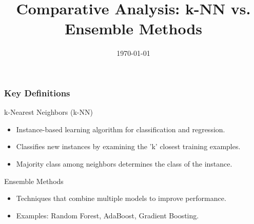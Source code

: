 \documentclass[aspectratio=169]{beamer}
\begin{document}
\begin{frame}
    \title{Comparative Analysis: k-NN vs. Ensemble Methods}
    \date{\today}
    \maketitle
\end{frame}

\begin{frame}[fragile]
    \frametitle{Key Definitions}

    \begin{block}{k-Nearest Neighbors (k-NN)}
        \begin{itemize}
            \item Instance-based learning algorithm for classification and regression.
            \item Classifies new instances by examining the 'k' closest training examples.
            \item Majority class among neighbors determines the class of the instance.
        \end{itemize}
    \end{block}

    \begin{block}{Ensemble Methods}
        \begin{itemize}
            \item Techniques that combine multiple models to improve performance.
            \item Examples: Random Forest, AdaBoost, Gradient Boosting.
        \end{itemize}
    \end{block}
\end{frame}
\end{document}
